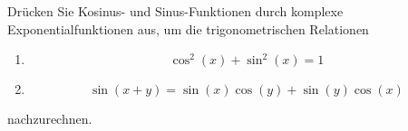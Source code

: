 \begin{ExerciseBlock}
Drücken Sie Kosinus- und Sinus-Funktionen durch komplexe Exponentialfunktionen aus, um die trigonometrischen Relationen

\begin{enumerate}[label=\alph*)]
	\item \[ \cos^2(x) + \sin^2(x) = 1 \]
	\item \[ \sin(x + y) = \sin(x) \cos(y) + \sin(y) \cos(x) \]

\end{enumerate}

nachzurechnen.

\end{ExerciseBlock}
